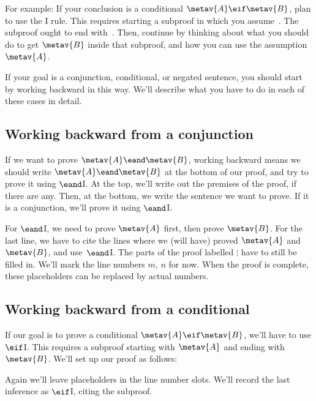 For example: If your conclusion is a conditional $\metav{A}\eif\metav{B}$, plan to use the {\eif}I rule. This requires starting a subproof in which you assume~. The subproof ought to end with~. Then, continue by thinking about what you should do to get $\metav{B}$ inside that subproof, and how you can use the assumption~$\metav{A}$.

If your goal is a conjunction, conditional, or negated sentence, you should start by working backward in this way. We'll describe what you have to do in each of these cases in detail.

\subsection*{Working backward from a conjunction}

If we want to prove $\metav{A} \eand \metav{B}$, working backward means we should write $\metav{A} \eand \metav{B}$ at the bottom of our proof, and try to prove it using $\eand$I. At the top, we'll write out the premises of the proof, if there are any. Then, at the bottom, we write the sentence we want to prove. If it is a conjunction, we'll prove it using $\eand$I.
  \begin{fitchproof}
	\ellipsesline 
\ellipsesline
    \ellipsesline 
  \end{fitchproof}
For $\eand$I, we need to prove $\metav{A}$ first, then prove $\metav{B}$. For the last line, we have to cite the lines where we (will have) proved $\metav{A}$ and  $\metav{B}$, and use~$\eand$I. The parts of the proof labelled $\vdots$ have to still be filled in. We'll mark the line numbers $m$, $n$ for now. When the proof is complete, these placeholders can be replaced by actual numbers.

\subsection*{Working backward from a conditional}

If our goal is to prove a conditional $\metav{A} \eif \metav{B}$, we'll have to use $\eif$I. This requires a subproof starting with $\metav{A}$ and ending with~$\metav{B}$. We'll set up our proof as follows:
\begin{fitchproof}
\open
{}
\ellipsesline 
{}
\close
{}
\end{fitchproof} 
Again we'll leave placeholders in the line number slots. We'll record the last inference as $\eif$I, citing the subproof.

